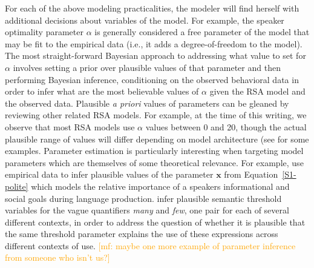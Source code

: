 \documentclass{sp}
\newcommand{\mf}[1]{\textcolor{orange}{[mf: #1]}}
\begin{document}
For each of the above modeling practicalities, the modeler will find herself with additional decisions about variables of the model. For example, the speaker optimality parameter $\alpha$ is generally considered a free parameter of the model that may be fit to the empirical data (i.e., it adds a degree-of-freedom to the model). The most straight-forward Bayesian approach to addressing what value to set for $\alpha$ involves setting a prior over plausible values of that parameter and then performing Bayesian inference, conditioning on the observed behavioral data in order to infer what are the most believable values of $\alpha$ given the RSA model and the observed data.
Plausible \emph{a priori} values of parameters can be gleaned by reviewing other related RSA models. For example, at the time of this writing, we observe that most RSA models use $\alpha$ values between 0 and 20, though the actual plausible range of values will differ depending on model architecture (see \citealp{tesslergoodman2019, yoonetal2020} for some examples.
Parameter estimation is particularly interesting when targeting model parameters which are themselves of some theoretical relevance.
For example, \citet{yoonetal2016} use empirical data to infer plausible values of the parameter $\textbf{x}$ from Equation~\eqref{S1-polite} which models the relative importance of a speakers informational and social goals during language production.
\citet{FrankeScholler2016:Semantic-values} infer plausible semantic threshold variables for the vague quantifiers \emph{many} and \emph{few}, one pair for each of several different contexts, in order to address the question of whether it is plausible that the same threshold parameter explains the use of these expressions across different contexts of use.
\mf{maybe one more example of parameter inference from someone who isn't us?}
\end{document}
